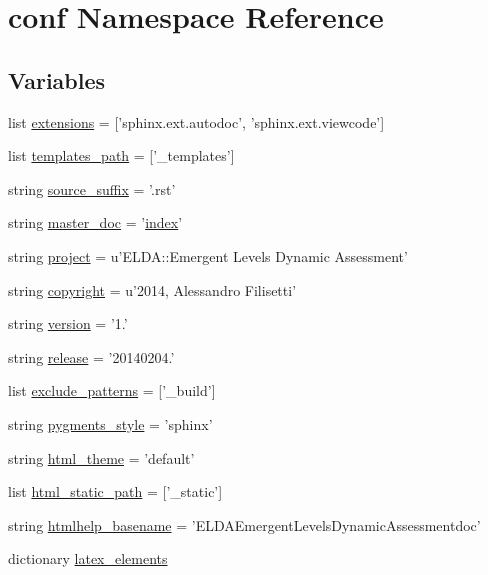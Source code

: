 \hypertarget{a00134}{\section{conf Namespace Reference}
\label{a00134}
}
\subsection*{Variables}
\begin{DoxyCompactItemize}
\item 
list \hyperlink{a00134_ae475e080536acb271a0a0efe56c3ba42}{extensions} = \mbox{[}'sphinx.\+ext.\+autodoc', 'sphinx.\+ext.\+viewcode'\mbox{]}
\item 
list \hyperlink{a00134_ae850ae634911b713e036b43894fdd525}{templates\+\_\+path} = \mbox{[}'\+\_\+templates'\mbox{]}
\item 
string \hyperlink{a00134_a10af2a769eb3bd3322e874f677e435b1}{source\+\_\+suffix} = '.rst'
\item 
string \hyperlink{a00134_a6fcd7e5236f355b1e1a55f9d95988810}{master\+\_\+doc} = '\hyperlink{a00102_a0cd6a44ffb07342cbc7e5ac33bfc9495}{index}'
\item 
string \hyperlink{a00134_a45653c983098153b78e33600e39230eb}{project} = u'E\+L\+D\+A\+::\+Emergent Levels Dynamic Assessment'
\item 
string \hyperlink{a00134_a33fa97cf51dcb25970fbf53f10159589}{copyright} = u'2014, Alessandro Filisetti'
\item 
string \hyperlink{a00134_ade15c5b54093b64d7c428ec19ca5b1cb}{version} = '1.'
\item 
string \hyperlink{a00134_a325dc746d8bf05c54d26351c35a21d90}{release} = '20140204.'
\item 
list \hyperlink{a00134_a7ad48fb6f3e9b129c02346ea0d3527c1}{exclude\+\_\+patterns} = \mbox{[}'\+\_\+build'\mbox{]}
\item 
string \hyperlink{a00134_a641130e096b26cba8a5d63ed38684de7}{pygments\+\_\+style} = 'sphinx'
\item 
string \hyperlink{a00134_a6c3bfcc1a44546c1c75ce20f55bd0fd6}{html\+\_\+theme} = 'default'
\item 
list \hyperlink{a00134_af4fb5d8851ccaade135c2668dd3ced41}{html\+\_\+static\+\_\+path} = \mbox{[}'\+\_\+static'\mbox{]}
\item 
string \hyperlink{a00134_aab7fddb2766ce3c430d8246fbfdbc7b1}{htmlhelp\+\_\+basename} = 'E\+L\+D\+A\+Emergent\+Levels\+Dynamic\+Assessmentdoc'
\item 
dictionary \hyperlink{a00134_a33619d385ad23765ac6ebb58bf82d43d}{latex\+\_\+elements}

\end{DoxyCompactItemize}
